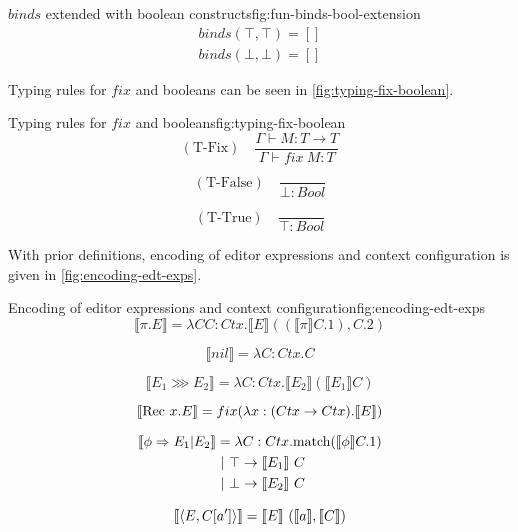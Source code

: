 \begin{myfigure}{$binds$ extended with boolean constructs}{fig:fun-binds-bool-extension}
    \[
        \begin{aligned}
            binds(\top,\top) = [] \\
            binds(\bot,\bot) = []
        \end{aligned}
    \]
\end{myfigure}

Typing rules for $fix$ and booleans can be seen in \cref{fig:typing-fix-boolean}.

\begin{myfigure}{Typing rules for $fix$ and booleans}{fig:typing-fix-boolean}
    \[
        (\text{T-Fix}) \quad \frac{\Gamma \vdash M : T \rightarrow T}{\Gamma \vdash fix \ M : T}
    \]

    \[
        (\text{T-False}) \quad \frac{}{\bot : Bool}
    \]

    \[
        (\text{T-True}) \quad \frac{}{\top : Bool}
    \]
\end{myfigure}

With prior definitions, encoding of editor expressions and context configuration is given in \cref{fig:encoding-edt-exps}.

\begin{myfigure}{Encoding of editor expressions and context configuration}{fig:encoding-edt-exps}
    \[
        \llbracket \pi.E \rrbracket = \lambda CC : Ctx.\llbracket E \rrbracket ((\llbracket \pi \rrbracket C.1), C.2)
    \]

    \[
        \llbracket nil \rrbracket = \lambda C : Ctx.C
    \]

    \[
        \llbracket E_1 \ggg E_2 \rrbracket = \lambda C : Ctx.\llbracket E_2 \rrbracket(\llbracket E_1 \rrbracket C)
    \]

    \[
        \llbracket \text{Rec } x.E \rrbracket = fix(\lambda x : (Ctx \rightarrow Ctx).\llbracket E \rrbracket)
    \]

    \[
        \begin{aligned}
            \llbracket \phi \Rightarrow E_1|E_2 \rrbracket & = \lambda C : Ctx.\text{match} (\llbracket \phi \rrbracket C.1) \\
                                           & \ | \ \top \rightarrow \llbracket E_1 \rrbracket \ C           \\
                                           & \ | \ \bot \rightarrow \llbracket E_2 \rrbracket \ C
        \end{aligned}
    \]

    \[
        \enc{\conf{E}{C[a']}} = \enc{E} \ (\enc{a}, \enc{C})
    \]
\end{myfigure}

